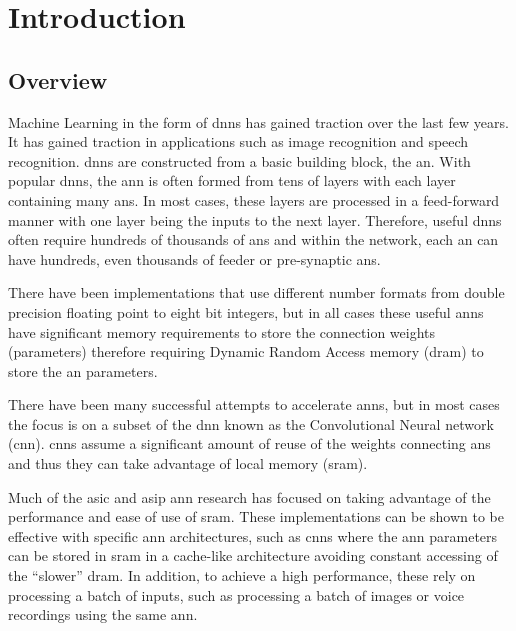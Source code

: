 
\chapter{Introduction}
\label{sec:Introduction}
\label{sec:chap-one}


\section{Overview}
\label{sec:overview}

Machine Learning in the form of \acfp{dnn} has gained traction over the last few years.
It has gained traction in applications such as image recognition and speech recognition.
\acp{dnn} are constructed from a basic building block, the \acf{an}.
With popular \acp{dnn}, the \acf{ann} is often formed from tens of layers with each layer containing many \acp{an}.
In most cases, these layers are processed in a feed-forward manner with one layer being the inputs to the next layer.
Therefore, useful \acp{dnn} often require hundreds of thousands of \acp{an} and within the network, each \ac{an} can have hundreds, even thousands of feeder or pre-synaptic \acp{an}.

There have been implementations that use different number formats from double precision floating point to eight bit integers, but in all cases these useful \ac{ann}s have significant
memory requirements to store the connection weights (parameters) therefore requiring Dynamic Random Access memory (\ac{dram}) to store the \ac{an} parameters.

There have been many successful attempts to accelerate \ac{ann}s, but in most cases the focus is on a subset of the \ac{dnn} known as the Convolutional Neural network (\ac{cnn}).
\acp{cnn} assume a significant amount of reuse of the weights connecting \acp{an} and thus they can take advantage of local memory (\ac{sram}).

Much of the \ac{asic} and \ac{asip} \ac{ann} research has focused on taking advantage of the performance and ease of use of \ac{sram}.
These implementations can be shown to be effective with specific \ac{ann} architectures, such as \ac{cnn}s where the \ac{ann} parameters can be stored in \ac{sram} in a cache-like architecture avoiding constant accessing of the ``slower'' \ac{dram}.
In addition, to achieve a high performance, these rely on processing a batch of inputs, such as processing a batch of images or voice recordings using the same \ac{ann}.

